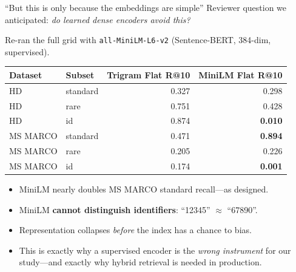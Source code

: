 \documentclass[10pt,aspectratio=169]{beamer}
\begin{document}
\begin{frame}{``But this is only because the embeddings are simple''}
  Reviewer question we anticipated: \emph{do learned dense encoders avoid this?}

  \medskip
  Re-ran the full grid with \texttt{all-MiniLM-L6-v2} (Sentence-BERT, 384-dim, supervised).

  \medskip
  \begin{center}
    \small
    \setlength{\tabcolsep}{6pt}
    \begin{tabular}{llrr}
      \toprule
      Dataset & Subset & Trigram Flat R@10 & \textbf{MiniLM Flat R@10} \\
      \midrule
      HD       & standard & 0.327 & 0.298 \\
      HD       & rare     & 0.751 & 0.428 \\
      HD       & {\color{accent}id} & {\color{good}0.874} & {\color{accent}\textbf{0.010}} \\
      MS MARCO & standard & 0.471 & {\color{good}\textbf{0.894}} \\
      MS MARCO & rare     & 0.205 & 0.226 \\
      MS MARCO & {\color{accent}id} & {\color{good}0.174} & {\color{accent}\textbf{0.001}} \\
      \bottomrule
    \end{tabular}
  \end{center}

  \vspace{0.5em}
  \begin{itemize}
    \item MiniLM nearly doubles MS MARCO standard recall---as designed.
    \item MiniLM \textbf{cannot distinguish identifiers}: ``12345'' $\approx$ ``67890''.
    \item Representation collapses \emph{before} the index has a chance to bias.
    \item This is exactly why a supervised encoder is the \emph{wrong instrument}
          for our study---and exactly why hybrid retrieval is needed in production.
  \end{itemize}
\end{frame}
\end{document}
